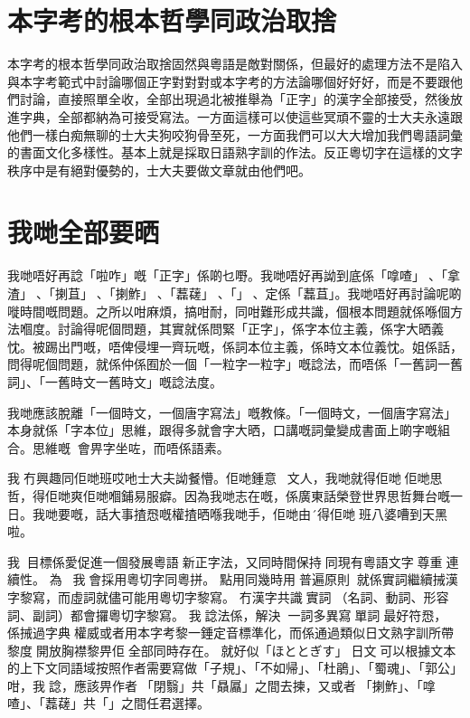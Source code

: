\documentclass[a5paper, 10pt, openany]{book} %
\begin{document}
\chapter{本字考的根本哲學同政治取捨}

本字考的根本哲學同政治取捨固然與粵語是敵對關係，但最好的處理方法不是陷入與本字考範式中討論哪個正字對對對或本字考的方法論哪個好好好，而是不要跟他們討論，直接照單全收，全部出現過北被推舉為「正字」的漢字全部接受，然後放進字典，全部都納為可接受寫法。一方面這樣可以使這些冥頑不靈的士大夫永遠跟他們一樣白痴無聊的士大夫狗咬狗骨至死，一方面我們可以大大增加我們粵語詞彙的書面文化多樣性。基本上就是採取日語熟字訓的作法。反正粵切字在這樣的文字秩序中是有絕對優勢的，士大夫要做文章就由他們吧。


\chapter{我哋全部要晒}
我哋唔好再諗「啦咋」嘅「正字」係啲乜嘢。我哋唔好再詏到底係「嗱喳」󱔖、「拿渣」󱔖、「揦苴」󱔖、「揦鮓」󱔖、「藞䕢」󱔖、「」󱔖、定係「藞苴」。我哋唔好再討論呢啲嘥時間嘅問題。之所以咁麻煩，搞咁耐，同咁難形成共識，個根本問題就係喺個方法嗰度。討論得呢個問題，其實就係問緊「正字」，係字本位主義，係字大晒義忱。被踢出門嘅，唔俾侵埋一齊玩嘅，係詞本位主義，係時文本位義忱。姐係話，問得呢個問題，就係仲係囿於一個「一粒字一粒字」嘅諗法，而唔係「一舊詞一舊詞」、「一舊時文一舊時文」嘅諗法度。

我哋應該脫離「一個時文，一個唐字寫法」嘅教條。「一個時文，一個唐字寫法」本身就係「字本位」思維，跟得多就會字大晒，口講嘅詞彙變成書面上啲字嘅組合。思維嘅會畀字坐咗，而唔係語素。


我冇興趣同佢哋班哎吔士大夫詏餐懵。佢哋鍾意文人，我哋就得佢哋佢哋思哲，得佢哋爽佢哋嗰鋪易服癖。因為我哋志在嘅，係廣東話榮登世界思哲舞台嘅一日。我哋要嘅，話大事揸𢝵嘅權揸晒喺我哋手，佢哋由´得佢哋󱐂班八婆嘈到天黑啦。

我󱝚目標係愛促進一個發展粵語󱝚新正字法，又同時間保持󱅽同現有粵語文字󱝚尊重連續性。 為󱃡󱜩，我會採用粵切字同粵拼。 點用同幾時用󱝚普遍原則󰳞，就係實詞繼續𢬿漢字黎寫，而虛詞就儘可能用粵切字黎寫。 冇漢字共識󱝚實詞󰳞（名詞、動詞、形容詞、副詞）都會攞粵切字黎寫。 我諗法係，解決󱟡一詞多異寫󱝚單詞󱝚最好符𢝵，𠄡係𢬿過字典󱝚權威或者用本字考黎一錘定音標準化，而係通過類似日文熟字訓所帶黎度󱝚開放胸襟黎畀佢全部同時存在。 就好似「ほととぎす」󱪙日文󰧵可以根據文本的上下文同語域按照作者需要寫做「子規」、「不如帰」、「杜鵑」、「蜀魂」、「郭公」咁，我諗，應該畀作者󱪙「閉翳」共「贔屭」之間去揀，又或者󱪙「揦鮓」、「嗱喳」、「藞䕢」共「」之間任君選擇。
\end{document}

